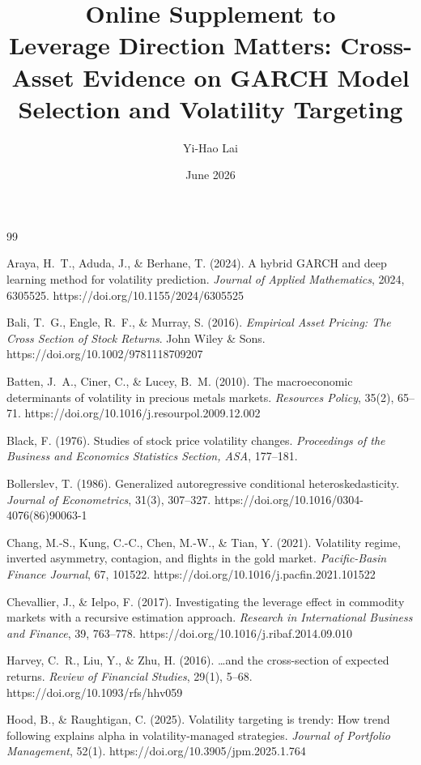 \documentclass[12pt,a4paper]{article}
\title{Online Supplement to\\Leverage Direction Matters: Cross-Asset Evidence on GARCH Model Selection and Volatility Targeting}
\author{Yi-Hao Lai}
\date{June 2026}
\begin{document}
\maketitle




\begin{thebibliography}{99}

Araya, H.~T., Aduda, J., \& Berhane, T. (2024). A hybrid GARCH and deep learning method for volatility prediction. \textit{Journal of Applied Mathematics}, 2024, 6305525. https://doi.org/10.1155/2024/6305525

Bali, T.~G., Engle, R.~F., \& Murray, S. (2016). \textit{Empirical Asset Pricing: The Cross Section of Stock Returns}. John Wiley \& Sons. https://doi.org/10.1002/9781118709207

Batten, J.~A., Ciner, C., \& Lucey, B.~M. (2010). The macroeconomic determinants of volatility in precious metals markets. \textit{Resources Policy}, 35(2), 65--71. https://doi.org/10.1016/j.resourpol.2009.12.002

Black, F. (1976). Studies of stock price volatility changes. \textit{Proceedings of the Business and Economics Statistics Section, ASA}, 177--181.

Bollerslev, T. (1986). Generalized autoregressive conditional heteroskedasticity. \textit{Journal of Econometrics}, 31(3), 307--327. https://doi.org/10.1016/0304-4076(86)90063-1

Chang, M.-S., Kung, C.-C., Chen, M.-W., \& Tian, Y. (2021). Volatility regime, inverted asymmetry, contagion, and flights in the gold market. \textit{Pacific-Basin Finance Journal}, 67, 101522. https://doi.org/10.1016/j.pacfin.2021.101522

Chevallier, J., \& Ielpo, F. (2017). Investigating the leverage effect in commodity markets with a recursive estimation approach. \textit{Research in International Business and Finance}, 39, 763--778. https://doi.org/10.1016/j.ribaf.2014.09.010

Harvey, C.~R., Liu, Y., \& Zhu, H. (2016). \ldots and the cross-section of expected returns. \textit{Review of Financial Studies}, 29(1), 5--68. https://doi.org/10.1093/rfs/hhv059

Hood, B., \& Raughtigan, C. (2025). Volatility targeting is trendy: How trend following explains alpha in volatility-managed strategies. \textit{Journal of Portfolio Management}, 52(1). https://doi.org/10.3905/jpm.2025.1.764

\end{thebibliography}
\end{document}
